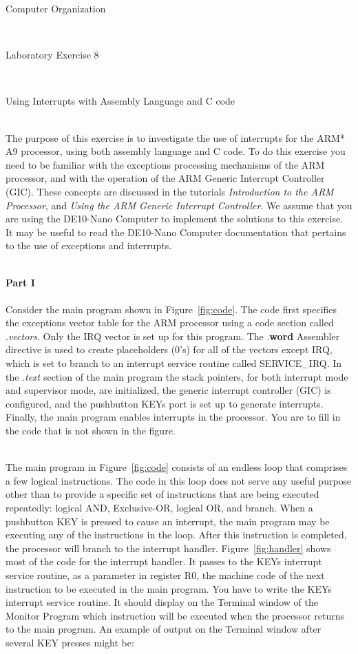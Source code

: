 \documentclass[epsfig,10pt,fullpage]{article}
\newcommand{\LabNum}{8}
\begin{document}
\centerline{\huge Computer Organization}
~\\
\centerline{\huge Laboratory Exercise \LabNum}
~\\
\centerline{\large Using Interrupts with Assembly Language and C code}
~\\

\noindent
The purpose of this exercise is to investigate the use of interrupts for the ARM* A9
processor, using both assembly language and C code. To do this exercise you need to be familiar 
with the exceptions processing mechanisms of the ARM processor, and with the operation of
the ARM Generic Interrupt Controller (GIC). These concepts are discussed in the tutorials 
{\it Introduction to the ARM Processor}, and {\it Using the ARM Generic Interrupt
Controller}. We assume that you are using the DE10-Nano Computer to implement the
solutions to this exercise. It may be useful to read the DE10-Nano Computer documentation that
pertains to the use of exceptions and interrupts.

~\\
\noindent
{\bf Part I}
~\\
~\\
\noindent
Consider the main program shown in Figure~\ref{fig:code}. The code first specifies the
exceptions vector table for the ARM processor using a code section called .{\it vectors}.
Only the IRQ vector is set up for this program. The .{\bf word} Assembler directive is used to 
create placeholders (0's) for all of the vectors except IRQ, which is 
set to branch to an interrupt service routine called SERVICE\_IRQ.  
In the .{\it text} section of the main program the stack pointers, for both 
interrupt mode and supervisor mode, are initialized, the generic interrupt controller
(GIC) is configured, and the pushbutton KEYs port is set up to generate interrupts.
Finally, the main program enables interrupts in the processor.  You are to fill in the code that 
is not shown in the figure.  

~\\
\noindent
The main program in Figure~\ref{fig:code} consists of an endless loop that comprises 
a few logical instructions. The code in this loop does not serve any useful purpose other 
than to provide a specific set of instructions that are being executed repeatedly: logical
AND, Exclusive-OR, logical OR, and branch. When a pushbutton KEY is pressed to cause an 
interrupt, the main program may be executing any of the instructions in the loop. After 
this instruction is completed, the processor will branch to the interrupt handler. 
Figure~\ref{fig:handler} shows most of the code for the interrupt handler. It passes to 
the KEYs interrupt service routine, as a parameter in register R0, the machine code 
of the next instruction to be executed in the main program. You have to write the KEYs interrupt 
service routine. It should display on the Terminal window of the Monitor Program which 
instruction will be executed when the processor returns to the main program. 
An example of output on the Terminal window after several KEY presses might be:
\end{document}
